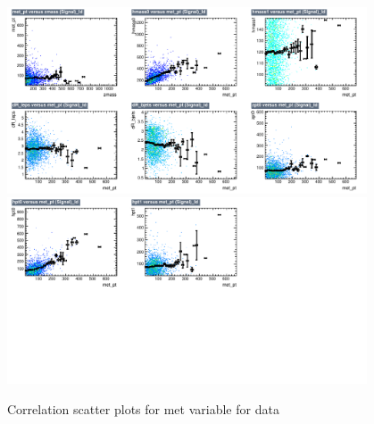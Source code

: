 \begin{figure}[!htb]%
\centering
\includegraphics[width=0.95\textwidth]{figures/CRTT/dataset/plots/correlationscatter_met_pt__Id_c1.pdf}
\includegraphics[width=0.95\textwidth]{figures/CRTT/dataset/plots/correlationscatter_met_pt__Id_c2.pdf}
\caption{ Correlation scatter plots for met variable for data}%
\label{fig:correlations_CRTT_met_pt_S}                                                       
\end{figure}



